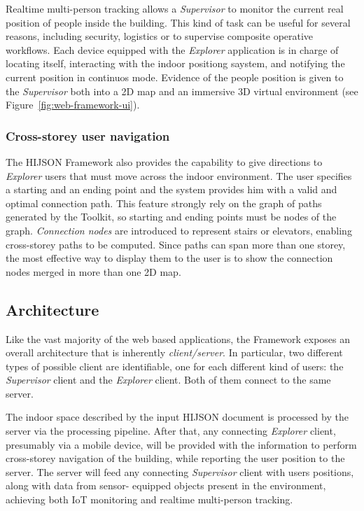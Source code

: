 Realtime multi-person tracking allows a \emph{Supervisor} to monitor the current
real position of people inside the building. This kind of task can be useful for
several reasons, including security, logistics or to supervise composite operative
workflows. Each device equipped with the \emph{Explorer} application is in charge of locating
itself, interacting with the indoor positiong saystem, and notifying the current
position in continuos mode. Evidence of the people position is given to the
\emph{Supervisor} both into a 2D map and an immersive 3D virtual environment (see Figure~\ref{fig:web-framework-ui}).

\subsubsection{Cross-storey user navigation}\label{cross-storey-user-navigation}

The HIJSON Framework also provides the capability to give directions to
\emph{Explorer} users that must move across the indoor environment. The
user specifies a starting and an ending point and the system provides him with
a valid and optimal connection path. This feature
strongly rely on the graph of paths generated by the Toolkit, so starting and
ending points must be nodes of the graph. \emph{Connection nodes} are introduced to
represent stairs or elevators, enabling cross-storey paths to be computed.
Since paths can span more than one storey, the most effective way
to display them to the user is to show the connection nodes merged in more than one 2D map.

\subsection{Architecture}\label{architecture}

Like the vast majority of the web based applications, the Framework exposes an
overall architecture that is inherently \emph{client/server}. In particular,
two different types of possible client are identifiable, one for each different 
kind of users: the \emph{Supervisor} client and the \emph{Explorer} client. 
Both of them connect to the same server.

The indoor space described by the input HIJSON document is
processed by the server via the processing pipeline. After that, any connecting
\emph{Explorer} client, presumably via a mobile device, will be provided
with the information to perform cross-storey navigation of the building, while
reporting the user position to the server. The server will feed any connecting
\emph{Supervisor} client with users positions, along with data from sensor-
equipped objects present in the environment, achieving both IoT monitoring and 
realtime multi-person tracking.

